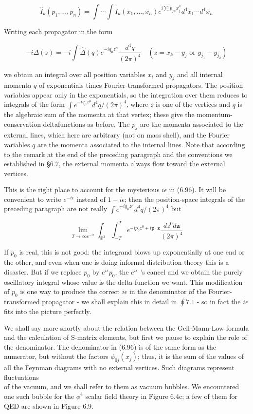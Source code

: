 \documentclass[10pt, letterpaper]{article}
\begin{document}
$$
\widehat{I}_{k}\left(p_{1}, \ldots, p_{n}\right)=\int \cdots \int I_{k}\left(x_{1}, \ldots, x_{n}\right) e^{i \sum p_{j \mu} x_{j}^{\mu}} d^{4} x_{1} \cdots d^{4} x_{n}
$$

Writing each propagator in the form

$$
-i \Delta(z)=-i \int \widehat{\Delta}(q) e^{-i q_{\mu} z^{\mu}} \frac{d^{4} q}{(2 \pi)^{4}} \quad\left(z=x_{k}-y_{j} \text { or } y_{j_{1}}-y_{j_{2}}\right)
$$

we obtain an integral over all position variables $x_{i}$ and $y_{j}$ and all internal momenta $q$ of exponentials times Fourier-transformed propagators. The position variables appear only in the exponentials, so the integration over them reduces to integrals of the form $\int e^{-i q_{\mu} z^{\mu}} d^{4} q /(2 \pi)^{4}$, where $z$ is one of the vertices and $q$ is the algebraic sum of the momenta at that vertex; these give the momentum-conservation deltafunctions as before. The $p_{j}$ are the momenta associated to the external lines, which here are arbitrary (not on mass shell), and the Fourier variables $q$ are the momenta associated to the internal lines. Note that according to the remark at the end of the preceding paragraph and the conventions we established in §6.7, the external momenta always flow toward the external vertices.

This is the right place to account for the mysterious $i \epsilon$ in (6.96). It will be convenient to write $e^{-i \epsilon}$ instead of $1-i \epsilon$; then the position-space integrals of the preceding paragraph are not really $\int e^{-i q_{\mu} z^{\mu}} d^{4} q /(2 \pi)^{4}$ but

$$
\lim _{T \rightarrow \infty e^{-i \epsilon}} \int_{\mathbb{R}^{3}} \int_{-T}^{T} e^{-i p_{0} z^{0}+i \mathbf{p} \cdot \mathbf{z}} \frac{d z^{0} d \mathbf{z}}{(2 \pi)^{4}}
$$

If $p_{0}$ is real, this is not good: the integrand blows up exponentially at one end or the other, and even when one is doing informal distribution theory this is a disaster. But if we replace $p_{0}$ by $e^{i \epsilon} p_{0}$, the $e^{i \epsilon}$ 's cancel and we obtain the purely oscillatory integral whose value is the delta-function we want. This modification of $p_{0}$ is one way to produce the correct $i \epsilon$ in the denominator of the Fourier-transformed propagator - we shall explain this in detail in $\oint 7.1$ - so in fact the $i \epsilon$ fits into the picture perfectly.

We shall say more shortly about the relation between the Gell-Mann-Low formula and the calculation of S-matrix elements, but first we pause to explain the role of the denominator. The denominator in (6.96) is of the same form as the numerator, but without the factors $\phi_{0 j}\left(x_{j}\right)$; thus, it is the sum of the values of all the Feynman diagrams with no external vertices. Such diagrams represent fluctuations\\
of the vacuum, and we shall refer to them as vacuum bubbles. We encountered one such bubble for the $\phi^{4}$ scalar field theory in Figure 6.4c; a few of them for QED are shown in Figure 6.9.
\end{document}
